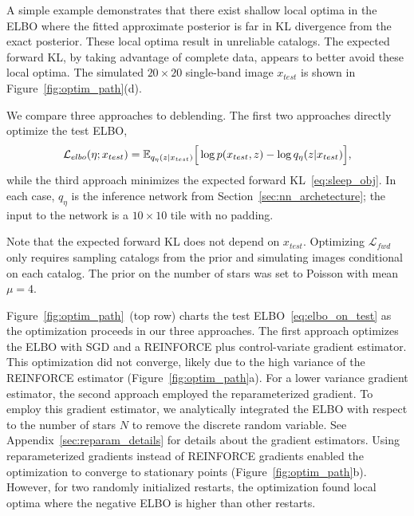 

\label{sec:elbo_sleep_compare}

A simple example demonstrates that there exist shallow local optima in the ELBO
where the fitted approximate posterior is far in KL divergence from the exact posterior.
These local optima result in unreliable catalogs.
The expected forward KL, by taking advantage of complete data, appears to better avoid these local optima.
The simulated $20\times20$ single-band image $x_{test}$ is shown in Figure~\ref{fig:optim_path}(d).

We compare three approaches to deblending. The first two approaches directly optimize the test ELBO,
\begin{align}
\mathcal{L}_{elbo}(\eta; x_{test}) = \mathbb{E}_{q_{\eta}(z | x_{test})}\Big[\log p(x_{test}, z) - \log q_{\eta}(z | x_{test})\Big],
\label{eq:elbo_on_test}
\end{align}
while the third approach minimizes the expected forward KL~\eqref{eq:sleep_obj}.
In each case, $q_\eta$ is the inference network from Section~\ref{sec:nn_archetecture};
the input to the network is a $10\times 10$ tile with no padding.

Note that the expected forward KL does not depend on $x_{test}$.
Optimizing $\mathcal{L}_{fwd}$ only requires sampling catalogs from the prior
and simulating images conditional on each catalog.
The prior on the number of stars was set to Poisson with mean $\mu = 4$.

Figure~\ref{fig:optim_path}~(top row) charts the test ELBO~\eqref{eq:elbo_on_test}
as the optimization proceeds in our three approaches.
The first approach optimizes the ELBO with SGD and a REINFORCE plus control-variate gradient estimator.
This optimization did not converge, likely due to the high variance of the REINFORCE estimator (Figure~\ref{fig:optim_path}a).
For a lower variance gradient estimator, the second approach employed the reparameterized gradient. To employ this gradient estimator, we analytically integrated the ELBO with respect to the number of stars $N$ to remove the discrete random variable.
See Appendix~\ref{sec:reparam_details} for details about the gradient estimators.
Using reparameterized gradients instead of REINFORCE gradients enabled the optimization to converge to stationary points (Figure~\ref{fig:optim_path}b).
However, for two randomly initialized restarts,
the optimization found local optima where the negative ELBO is higher than other restarts.

